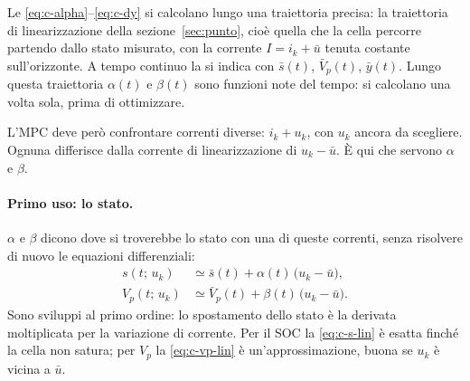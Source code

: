 \documentclass[11pt,a4paper]{article}
\begin{document}
Le \eqref{eq:c-alpha}--\eqref{eq:c-dy} si calcolano lungo una traiettoria
precisa: la traiettoria di linearizzazione della sezione~\ref{sec:punto}, cioè
quella che la cella percorre partendo dallo stato misurato, con la corrente
$I = i_k + \bar u$ tenuta costante sull'orizzonte. A tempo continuo la si
indica con $\bar s(t)$, $\bar V_p(t)$, $\bar y(t)$. Lungo questa traiettoria
$\alpha(t)$ e $\beta(t)$ sono funzioni note del tempo: si calcolano una volta
sola, prima di ottimizzare.

L'MPC deve però confrontare correnti diverse: $i_k + u_k$, con $u_k$ ancora da
scegliere. Ognuna differisce dalla corrente di linearizzazione di
$u_k - \bar u$. È qui che servono $\alpha$ e $\beta$.

\paragraph{Primo uso: lo stato.} $\alpha$ e $\beta$ dicono dove si troverebbe
lo stato con una di queste correnti, senza risolvere di nuovo le equazioni
differenziali:
\begin{align}
  s(t;\, u_k) &\simeq \bar s(t) + \alpha(t)\,\bigl(u_k - \bar u\bigr) ,
     \tag{C9}\label{eq:c-s-lin}\\
  V_p(t;\, u_k) &\simeq \bar V_p(t) + \beta(t)\,\bigl(u_k - \bar u\bigr) .
     \tag{C10}\label{eq:c-vp-lin}
\end{align}
Sono sviluppi al primo ordine: lo spostamento dello stato è la derivata
moltiplicata per la variazione di corrente. Per il SOC la \eqref{eq:c-s-lin} è
esatta finché la cella non satura; per $V_p$ la \eqref{eq:c-vp-lin} è
un'approssimazione, buona se $u_k$ è vicina a $\bar u$.
\end{document}
